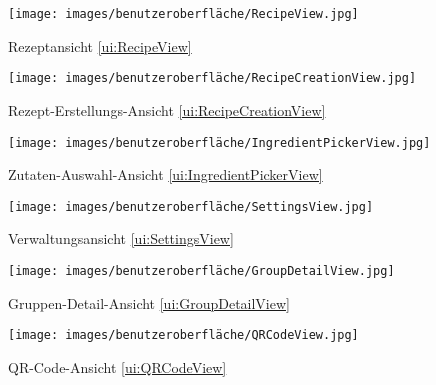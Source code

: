 \documentclass[parskip=full]{scrartcl}
\begin{document}
\begin{figure}[htp]
    \begin{minipage}
        [t]{0.49\textwidth}
        \centering
        \texttt{[image: images/benutzeroberfläche/RecipeView.jpg]}
        \caption{Rezeptansicht \ref{ui:RecipeView}}
        \label{fig:RecipeView}
    \end{minipage}
    \begin{minipage}
        [t]{0.49\textwidth}
        \centering
        \texttt{[image: images/benutzeroberfläche/RecipeCreationView.jpg]}
        \caption{Rezept-Erstellungs-Ansicht \ref{ui:RecipeCreationView}}
        \label{fig:RecipeCreationView}
    \end{minipage}
\end{figure}
\begin{figure}[htp]
    \begin{minipage}
        [t]{0.49\textwidth}
        \centering
        \texttt{[image: images/benutzeroberfläche/IngredientPickerView.jpg]}
        \caption{Zutaten-Auswahl-Ansicht \ref{ui:IngredientPickerView}}
        \label{fig:IngredientPickerView}
    \end{minipage}
    \begin{minipage}
        [t]{0.49\textwidth}
        \centering
        \texttt{[image: images/benutzeroberfläche/SettingsView.jpg]}
        \caption{Verwaltungsansicht \ref{ui:SettingsView}}
        \label{fig:SettingsView}
    \end{minipage}
\end{figure}
\begin{figure}[htp]
    \begin{minipage}
        [t]{0.49\textwidth}
        \centering
        \texttt{[image: images/benutzeroberfläche/GroupDetailView.jpg]}
        \caption{Gruppen-Detail-Ansicht \ref{ui:GroupDetailView}}
        \label{fig:GroupDetailView}
    \end{minipage}
    \begin{minipage}
        [t]{0.49\textwidth}
        \centering
        \texttt{[image: images/benutzeroberfläche/QRCodeView.jpg]}
        \caption{QR-Code-Ansicht \ref{ui:QRCodeView}}
        \label{fig:QRCodeView}
    \end{minipage}
\end{figure}
\newpage
\renewcommand{\theparagraph}{\arabic{section}.\arabic{subsection}.\arabic{subsubsection}.\arabic{paragraph}}
\setcounter{secnumdepth}{3}
\end{document}
